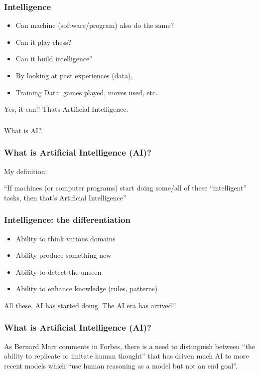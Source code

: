 \begin{frame}[fragile]\frametitle{Intelligence}
\begin{itemize}
\item Can machine (software/program) also do the same?
\item Can it play chess?
\item Can it build intelligence?
\item By looking at past experiences (data), 
\item Training Data: games played, moves used, etc.
\end{itemize}
Yes, it can!! Thats Artificial Intelligence.
\end{frame}

\begin{frame}[fragile]\frametitle{}
\begin{center}
{\Large What is AI?}
\end{center}
\end{frame}



\begin{frame}[fragile]\frametitle{ What is Artificial Intelligence (AI)?}
My definition:


``If machines (or computer programs) start doing some/all of these ``intelligent'' tasks, then that's Artificial Intelligence''

\end{frame}

\begin{frame}[fragile]\frametitle{ Intelligence: the differentiation}
\begin{itemize}
\item Ability to think various domains
\item Ability produce something new
\item Ability to detect the unseen
\item Ability to enhance knowledge (rules, patterns)
\end{itemize}
All these, AI has started doing. The AI era has arrived!!
\end{frame}

\begin{frame}[fragile]\frametitle{ What is Artificial Intelligence (AI)?}
 As Bernard Marr comments in Forbes, there is a need to distinguish between ``the ability to replicate or imitate human thought'' that has driven much AI to more recent models which ``use human reasoning as a model but not an end goal''.

\end{frame}

